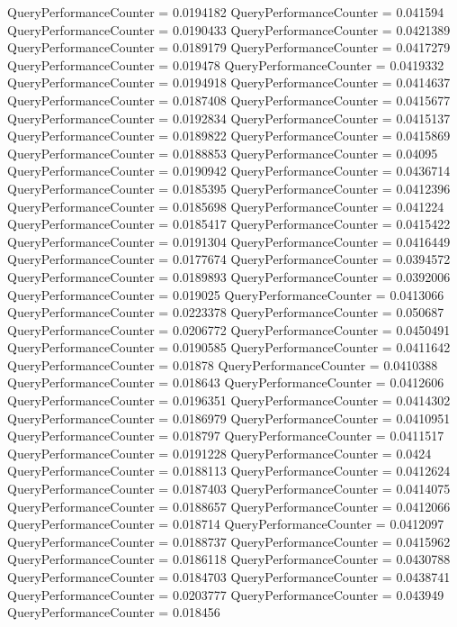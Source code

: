 \documentclass[9pt]{article}
\theoremstyle{plain}
\theoremstyle{definition}
\theoremstyle{remark}
\numberwithin{equation}{section}
\begin{document}
QueryPerformanceCounter  =  0.0194182
QueryPerformanceCounter  =  0.041594
QueryPerformanceCounter  =  0.0190433
QueryPerformanceCounter  =  0.0421389
QueryPerformanceCounter  =  0.0189179
QueryPerformanceCounter  =  0.0417279
QueryPerformanceCounter  =  0.019478
QueryPerformanceCounter  =  0.0419332
QueryPerformanceCounter  =  0.0194918
QueryPerformanceCounter  =  0.0414637
QueryPerformanceCounter  =  0.0187408
QueryPerformanceCounter  =  0.0415677
QueryPerformanceCounter  =  0.0192834
QueryPerformanceCounter  =  0.0415137
QueryPerformanceCounter  =  0.0189822
QueryPerformanceCounter  =  0.0415869
QueryPerformanceCounter  =  0.0188853
QueryPerformanceCounter  =  0.04095
QueryPerformanceCounter  =  0.0190942
QueryPerformanceCounter  =  0.0436714
QueryPerformanceCounter  =  0.0185395
QueryPerformanceCounter  =  0.0412396
QueryPerformanceCounter  =  0.0185698
QueryPerformanceCounter  =  0.041224
QueryPerformanceCounter  =  0.0185417
QueryPerformanceCounter  =  0.0415422
QueryPerformanceCounter  =  0.0191304
QueryPerformanceCounter  =  0.0416449
QueryPerformanceCounter  =  0.0177674
QueryPerformanceCounter  =  0.0394572
QueryPerformanceCounter  =  0.0189893
QueryPerformanceCounter  =  0.0392006
QueryPerformanceCounter  =  0.019025
QueryPerformanceCounter  =  0.0413066
QueryPerformanceCounter  =  0.0223378
QueryPerformanceCounter  =  0.050687
QueryPerformanceCounter  =  0.0206772
QueryPerformanceCounter  =  0.0450491
QueryPerformanceCounter  =  0.0190585
QueryPerformanceCounter  =  0.0411642
QueryPerformanceCounter  =  0.01878
QueryPerformanceCounter  =  0.0410388
QueryPerformanceCounter  =  0.018643
QueryPerformanceCounter  =  0.0412606
QueryPerformanceCounter  =  0.0196351
QueryPerformanceCounter  =  0.0414302
QueryPerformanceCounter  =  0.0186979
QueryPerformanceCounter  =  0.0410951
QueryPerformanceCounter  =  0.018797
QueryPerformanceCounter  =  0.0411517
QueryPerformanceCounter  =  0.0191228
QueryPerformanceCounter  =  0.0424
QueryPerformanceCounter  =  0.0188113
QueryPerformanceCounter  =  0.0412624
QueryPerformanceCounter  =  0.0187403
QueryPerformanceCounter  =  0.0414075
QueryPerformanceCounter  =  0.0188657
QueryPerformanceCounter  =  0.0412066
QueryPerformanceCounter  =  0.018714
QueryPerformanceCounter  =  0.0412097
QueryPerformanceCounter  =  0.0188737
QueryPerformanceCounter  =  0.0415962
QueryPerformanceCounter  =  0.0186118
QueryPerformanceCounter  =  0.0430788
QueryPerformanceCounter  =  0.0184703
QueryPerformanceCounter  =  0.0438741
QueryPerformanceCounter  =  0.0203777
QueryPerformanceCounter  =  0.043949
QueryPerformanceCounter  =  0.018456
\end{document}
